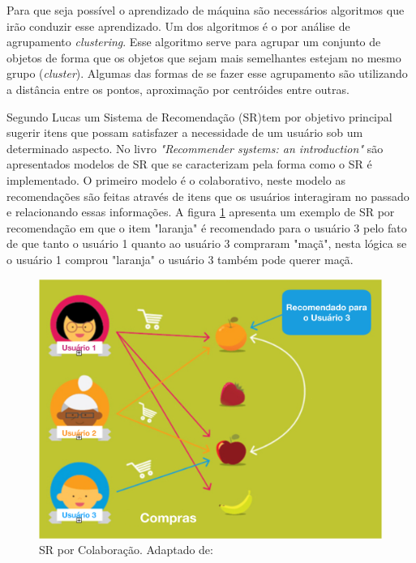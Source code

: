 Para que seja possível o aprendizado de máquina são necessários algoritmos que irão conduzir esse aprendizado. Um dos algoritmos é o por análise de agrupamento \textit{clustering}. Esse algoritmo serve para agrupar um conjunto de objetos de forma que os objetos que sejam mais semelhantes estejam no mesmo grupo (\textit{cluster}). Algumas das formas de se fazer esse agrupamento são utilizando a distância entre os pontos, aproximação por centróides entre outras.

Segundo Lucas \cite{brunialti2015aprendizado} um Sistema de Recomendação (SR)tem por objetivo principal sugerir itens que possam satisfazer a necessidade de um usuário sob um determinado aspecto. No livro \textit{"Recommender systems: an introduction"} \cite{jannach2010recommender} são apresentados modelos de SR que se caracterizam pela forma como o SR é implementado. O primeiro modelo é o colaborativo, neste modelo as recomendações são feitas através de itens que os usuários interagiram no passado e relacionando essas informações. A figura \ref{img:sr1} apresenta um exemplo de SR por recomendação em que o item "laranja" é recomendado para o usuário 3 pelo fato de que tanto o usuário 1 quanto ao usuário 3 compraram "maçã", nesta lógica se o usuário 1 comprou "laranja" o usuário 3 também pode querer maçã. 

\graphicspath{{figuras/}}
\begin{figure}[h!]
\centering
\includegraphics[scale=0.50]{sr1.png}
\caption{SR por Colaboração. Adaptado de: \cite{sarwar2001item}}
\label{img:sr1}
\end{figure}


